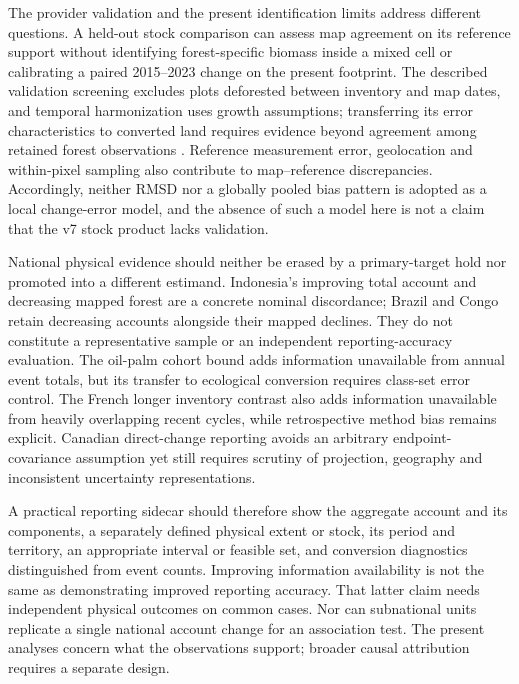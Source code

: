 \documentclass[11pt,a4paper]{article}
\begin{document}
The provider validation and the present identification limits address different questions. A held-out stock comparison can assess map agreement on its reference support without identifying forest-specific biomass inside a mixed cell or calibrating a paired 2015--2023 change on the present footprint. The described validation screening excludes plots deforested between inventory and map dates, and temporal harmonization uses growth assumptions; transferring its error characteristics to converted land requires evidence beyond agreement among retained forest observations \citep[pp.~13, 18--19]{PVIR2026}. Reference measurement error, geolocation and within-pixel sampling also contribute to map--reference discrepancies. Accordingly, neither RMSD nor a globally pooled bias pattern is adopted as a local change-error model, and the absence of such a model here is not a claim that the v7 stock product lacks validation.

National physical evidence should neither be erased by a primary-target hold nor promoted into a different estimand. Indonesia's improving total account and decreasing mapped forest are a concrete nominal discordance; Brazil and Congo retain decreasing accounts alongside their mapped declines. They do not constitute a representative sample or an independent reporting-accuracy evaluation. The oil-palm cohort bound adds information unavailable from annual event totals, but its transfer to ecological conversion requires class-set error control. The French longer inventory contrast also adds information unavailable from heavily overlapping recent cycles, while retrospective method bias remains explicit. Canadian direct-change reporting avoids an arbitrary endpoint-covariance assumption yet still requires scrutiny of projection, geography and inconsistent uncertainty representations.

A practical reporting sidecar should therefore show the aggregate account and its components, a separately defined physical extent or stock, its period and territory, an appropriate interval or feasible set, and conversion diagnostics distinguished from event counts. Improving information availability is not the same as demonstrating improved reporting accuracy. That latter claim needs independent physical outcomes on common cases. Nor can subnational units replicate a single national account change for an association test. The present analyses concern what the observations support; broader causal attribution requires a separate design.
\end{document}
